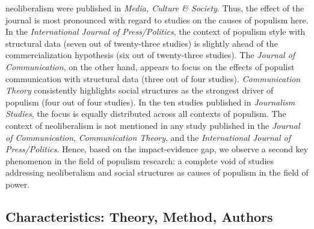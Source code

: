 \documentclass{tufte-handout}
\begin{document}
{{neoliberalism were published in \emph{Media, Culture \& Society}. Thus,
the effect of the journal is most pronounced with regard to studies on
the causes of populism here. In the \emph{International} \emph{Journal
of Press/Politics}, the context of populism style with structural data
(seven out of twenty-three studies) is slightly ahead of the
commercialization hypothesis (six out of twenty-three studies). The
\emph{Journal of Communication}, on the other hand, appears to focus on
the effects of populist communication with structural data (three out of
four studies). \emph{Communication Theory} consistently highlights
social structures as the strongest driver of populism (four out of four
studies). In the ten studies published in \emph{Journalism Studies}, the
focus is equally distributed across all contexts of populism. The
context of neoliberalism is not mentioned in any study published in the
\emph{Journal of Communication}, \emph{Communication Theory}, and the
\emph{International Journal of Press/Politics}. Hence, based on the
impact-evidence gap, we observe a second key phenomenon in the field of
populism research: a complete void of studies addressing neoliberalism
and social structures as causes of populism in the field of power.

\hypertarget{characteristics-theory-method-authors}{%
\subsection{Characteristics: Theory, Method,
Authors}
}\label{characteristics-theory-method-authors}

}}
\end{document}
